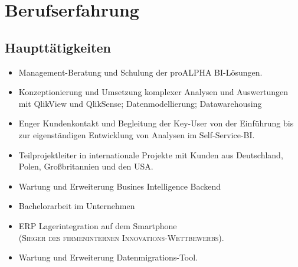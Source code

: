 %


%







\makecvtitle %

\section{Berufserfahrung}

\subsection{Hauptt\"atigkeiten}

{
	\begin{itemize}
		\item Management-Beratung und Schulung der proALPHA BI-L\"osungen. 
		\item Konzeptionierung und Umsetzung komplexer Analysen und Auswertungen mit QlikView und QlikSense; Datenmodellierung; Datawarehousing 
		\item Enger Kundenkontakt und Begleitung der Key-User von der Einf\"uhrung bis zur eigenst\"andigen Entwicklung von Analysen im Self-Service-BI. 
		\item Teilprojektleiter in internationale Projekte mit Kunden aus Deutschland, Polen, Gro\ss britannien und den USA. 
	\end{itemize}}

{ 
	\begin{itemize} 
		\item Wartung und Erweiterung Busines Intelligence Backend
		\item Bachelorarbeit im Unternehmen
		\item ERP Lagerintegration auf dem Smartphone\\ \textsc{(Sieger des firmeninternen Innovations-Wettbewerbs)}.
		\item Wartung und Erweiterung Datenmigrations-Tool. 
	\end{itemize}}

